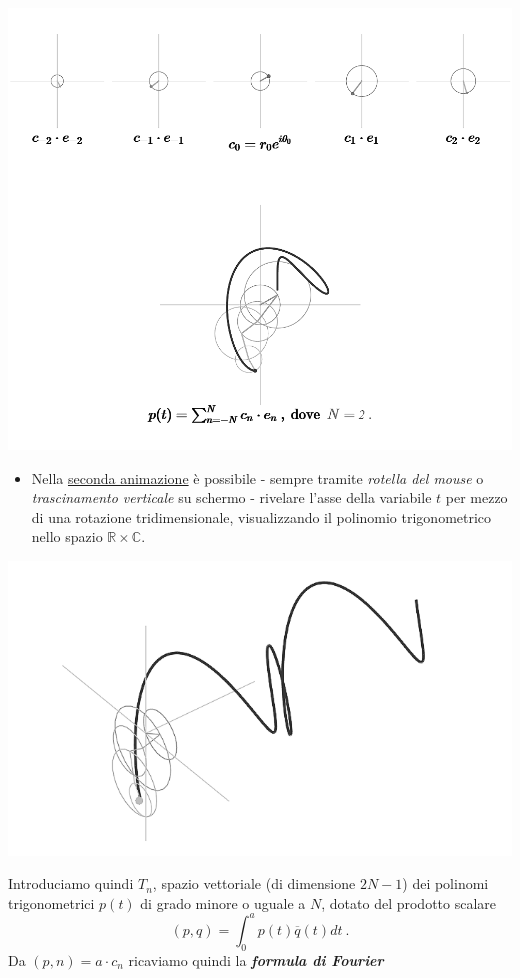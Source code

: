 \documentclass[
]{book}
\providecommand{\tightlist}{%
  \setlength{\itemsep}{0pt}\setlength{\parskip}{0pt}}
\begin{document}
\begin{center}\includegraphics[width=0.8\linewidth]{_images/pol-trig} \end{center}

\begin{itemize}
\tightlist
\item
  Nella \href{https://bradwave.github.io/thesis/\#/animazione-polinomi-trigonometrici-3d}{seconda animazione} è possibile - sempre tramite \emph{rotella del mouse} o \emph{trascinamento verticale} su schermo - rivelare l'asse della variabile \(t\) per mezzo di una rotazione tridimensionale, visualizzando il polinomio trigonometrico nello spazio \(\mathbb{R} \times \mathbb{C}\).
\end{itemize}

\begin{center}\includegraphics[width=0.5\linewidth]{_images/pol-3d} \end{center}

Introduciamo quindi \(T_n\), spazio vettoriale (di dimensione \(2N-1\)) dei polinomi trigonometrici \(p(t)\) di grado minore o uguale a \(N\), dotato del prodotto scalare
\[(p,q) = \int_{0}^{a} p(t) \overline{q}(t)dt \ .\]
Da \((p,n)=a\cdot c_n\) ricaviamo quindi la \emph{\textbf{formula di Fourier}}
\end{document}
